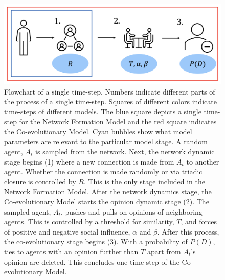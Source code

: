 \documentclass[11pt]{article}
\begin{document}
\begin{figure}[H]
  \centering
  \includegraphics[width=.9\linewidth]{../plots/schematics/model_representation.png}
\caption{Flowchart of a single time-step. Numbers indicate different parts of the process of a single time-step. Squares of different colors indicate time-steps of different models. The blue square depicts a single time-step for the Network Formation Model and the red square indicates the Co-evolutionary Model. Cyan bubbles show what model parameters are relevant to the particular model stage. A random agent, $A_t$ is sampled from the network. Next, the network dynamic stage begins (1) where a new connection is made from $A_t$ to another agent. Whether the connection is made randomly or via triadic closure is controlled by $R$. This is the only stage included in the Network Formation Model. After the network dynamics stage, the Co-evolutionary Model starts the opinion dynamic stage (2). The sampled agent, $A_t$, pushes and pulls on opinions of neighboring agents. This is controlled by a threshold for similarity, $T$, and forces of positive and negative social influence, $\alpha$ and $\beta$. After this process, the co-evolutionary stage begins (3). With a probability of $P(D)$, ties to agents with an opinion further than $T$ apart from $A_t$'s opinion are deleted. This concludes one time-step of the Co-evolutionary Model.}
\label{fig:flowchart}
\end{figure}
\end{document}
